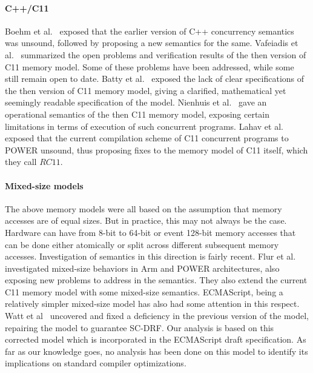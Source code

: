 \paragraph{C++/C11}
Boehm et al.~\cite{Boehm} exposed that the earlier version of C++ concurrency semantics was unsound, followed by proposing a new semantics for the same.
Vafeiadis et al.~\cite{Vafeiadis2} summarized the open problems and verification results of the then version of C11 memory model. Some of these problems have been addressed, while some still remain open to date. 
Batty et al.~\cite{BattyM} exposed the lack of clear specifications of the then version of C11 memory model, giving a clarified, mathematical yet seemingly readable specification of the model.
Nienhuis et al.~\cite{Nienhuis} gave an operational semantics of the then C11 memory model, exposing certain limitations in terms of execution of such concurrent programs.
Lahav et al.~\cite{Lahav} exposed that the current compilation scheme of C11 concurrent programs to POWER unsound, thus proposing fixes to the memory model of C11 itself, which they call $RC11$.

\paragraph{Mixed-size models}
The above memory models were all based on the assumption that memory accesses are of equal sizes. 
But in practice, this may not always be the case. 
Hardware can have from 8-bit to 64-bit or event 128-bit memory accesses that can be done either atomically or split across different subsequent memory accesses. 
Investigation of semantics in this direction is fairly recent.
Flur et al.~\cite{Flur} investigated mixed-size behaviors in Arm and POWER architectures, also exposing new problems to address in the semantics. 
They also extend the current C11 memory model with some mixed-size semantics.
ECMAScript, being a relatively simpler mixed-size model has also had some attention in this respect. 
Watt et al~\cite{WattC} uncovered and fixed a deficiency in the previous version of the model, repairing the model to guarantee SC-DRF.
Our analysis is based on this corrected model which is incorporated in the ECMAScript draft specification. 
As far as our knowledge goes, no analysis has been done on this model to identify its implications on standard compiler optimizations. 


